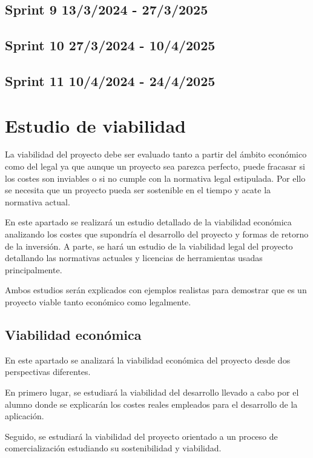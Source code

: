 \subsection{Sprint 9  13/3/2024 - 27/3/2025}


\subsection{Sprint 10  27/3/2024 - 10/4/2025}


\subsection{Sprint 11  10/4/2024 - 24/4/2025}


\section{Estudio de viabilidad}
La viabilidad del proyecto debe ser evaluado tanto a partir del ámbito económico como del legal ya que aunque un proyecto sea parezca perfecto, puede fracasar si los costes son inviables o si no cumple con la normativa legal estipulada.
Por ello se necesita que un proyecto pueda ser sostenible en el tiempo y acate la normativa actual.

En este apartado se realizará un estudio detallado de la viabilidad económica analizando los costes que supondría el desarrollo del proyecto y formas de retorno de la inversión. A parte, se hará un estudio de la viabilidad legal del proyecto detallando las normativas actuales y licencias de herramientas usadas principalmente.

Ambos estudios serán explicados con ejemplos realistas para demostrar que es un proyecto viable tanto económico como legalmente.

\subsection{Viabilidad económica}
En este apartado se analizará la viabilidad económica del proyecto desde dos perspectivas diferentes. 

En primero lugar, se estudiará la viabilidad del desarrollo llevado a cabo por el alumno donde se explicarán los costes reales empleados para el desarrollo de la aplicación. 

Seguido, se estudiará la viabilidad del proyecto orientado a un proceso de comercialización estudiando su sostenibilidad y viabilidad.



